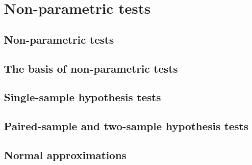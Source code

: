\chapter{Non-parametric tests}

\section{Non-parametric tests}
\section{The basis of non-parametric tests}
\section{Single-sample hypothesis tests}
\section{Paired-sample and two-sample hypothesis tests}
\section{Normal approximations}